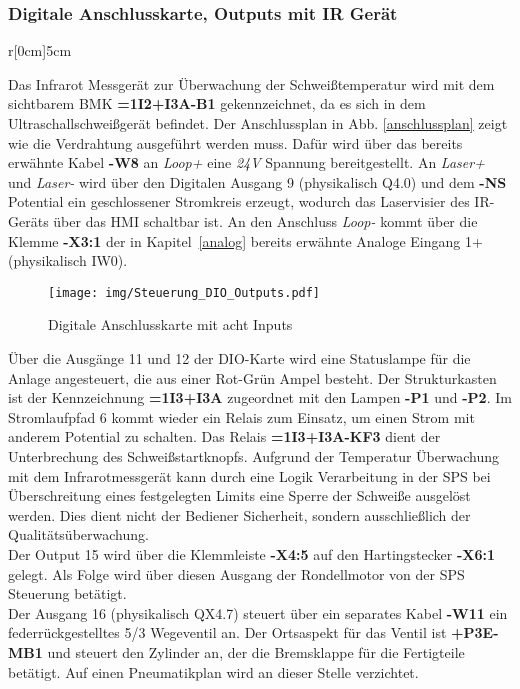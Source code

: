 \documentclass[12pt,a4paper]{scrartcl}	%
\begin{document}
\subsubsection{Digitale Anschlusskarte, Outputs mit IR Gerät}\label{ir}
\begin{wrapfigure}[]{r}[0cm]{5cm}
	\caption{Anschlussplan}
	\label{anschlussplan}
\end{wrapfigure}
Das Infrarot Messgerät zur Überwachung der Schweißtemperatur wird mit dem sichtbarem BMK \mbox{\textbf{=1I2+I3A-B1}} gekennzeichnet, da es sich in dem Ultraschallschweißgerät befindet. Der Anschlussplan in Abb. \ref{anschlussplan} zeigt wie die Verdrahtung ausgeführt werden muss. Dafür wird über das bereits erwähnte Kabel \mbox{\textbf{-W8}} an \textit{Loop+} eine \textit{24V} Spannung bereitgestellt. An \textit{Laser+} und \textit{Laser-} wird über den Digitalen Ausgang 9 (physikalisch Q4.0) und dem \mbox{\textbf{-NS}} Potential ein geschlossener Stromkreis erzeugt, wodurch das Laservisier des IR-Geräts über das HMI schaltbar ist. An den Anschluss \textit{Loop-} kommt über die Klemme \mbox{\textbf{-X3:1}} der in \mbox{Kapitel \ref{analog}} bereits erwähnte Analoge Eingang 1+ (physikalisch IW0).
\begin{figure}[htb]
	\centering
	\texttt{[image: img/Steuerung\_DIO\_Outputs.pdf]}
	\caption{Digitale Anschlusskarte mit acht Inputs}
	
\end{figure}
Über die Ausgänge 11 und 12 der DIO-Karte wird eine Statuslampe für die Anlage angesteuert, die aus einer Rot-Grün Ampel besteht. Der Strukturkasten ist der Kennzeichnung \mbox{\textbf{=1I3+I3A}} zugeordnet mit den Lampen \mbox{\textbf{-P1}} und \mbox{\textbf{-P2}}. Im Stromlaufpfad 6 kommt wieder ein Relais zum Einsatz, um einen Strom mit anderem Potential zu schalten. Das Relais \mbox{\textbf{=1I3+I3A-KF3}} dient der Unterbrechung des Schweißstartknopfs. Aufgrund der Temperatur Überwachung mit dem Infrarotmessgerät kann durch eine Logik Verarbeitung in der SPS bei Überschreitung eines festgelegten Limits eine Sperre der Schweiße ausgelöst werden. Dies dient nicht der Bediener Sicherheit, sondern ausschließlich der Qualitätsüberwachung.\\
Der Output 15 wird über die Klemmleiste \mbox{\textbf{-X4:5}} auf den Hartingstecker \mbox{\textbf{-X6:1}} gelegt. Als Folge wird über diesen Ausgang der Rondellmotor von der SPS Steuerung betätigt.\\
Der Ausgang 16 (physikalisch QX4.7) steuert über ein separates Kabel \mbox{\textbf{-W11}} ein federrückgestelltes 5/3 Wegeventil an. Der Ortsaspekt für das Ventil ist \mbox{\textbf{+P3E-MB1}} und steuert den Zylinder an, der die Bremsklappe für die Fertigteile betätigt. Auf einen Pneumatikplan wird an dieser Stelle verzichtet.
\end{document}
